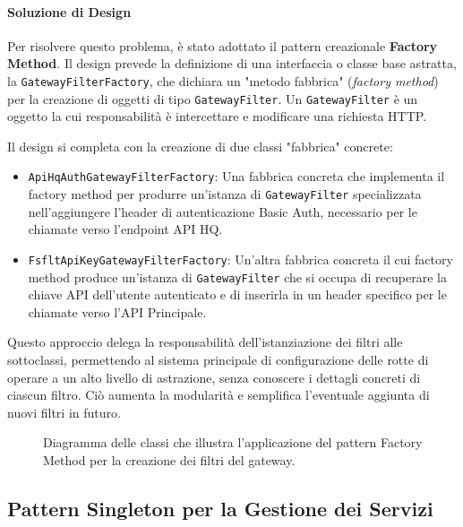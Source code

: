 \documentclass[12pt,a4paper,openright,twoside]{book}
\begin{document}
\paragraph{Soluzione di Design}
Per risolvere questo problema, è stato adottato il pattern creazionale \textbf{Factory Method}. Il design prevede la definizione di una interfaccia o classe base astratta, la \texttt{GatewayFilterFactory}, che dichiara un "metodo fabbrica" (\textit{factory method}) per la creazione di oggetti di tipo \texttt{GatewayFilter}. Un \texttt{GatewayFilter} è un oggetto la cui responsabilità è intercettare e modificare una richiesta HTTP.

Il design si completa con la creazione di due classi "fabbrica" concrete:
\begin{itemize}
    \item \texttt{ApiHqAuthGatewayFilterFactory}: Una fabbrica concreta che implementa il factory method per produrre un'istanza di \texttt{GatewayFilter} specializzata nell'aggiungere l'header di autenticazione Basic Auth, necessario per le chiamate verso l'endpoint API HQ.
    \item \texttt{FsfltApiKeyGatewayFilterFactory}: Un'altra fabbrica concreta il cui factory method produce un'istanza di \texttt{GatewayFilter} che si occupa di recuperare la chiave API dell'utente autenticato e di inserirla in un header specifico per le chiamate verso l'API Principale.
\end{itemize}
Questo approccio delega la responsabilità dell'istanziazione dei filtri alle sottoclassi, permettendo al sistema principale di configurazione delle rotte di operare a un alto livello di astrazione, senza conoscere i dettagli concreti di ciascun filtro. Ciò aumenta la modularità e semplifica l'eventuale aggiunta di nuovi filtri in futuro.

\vspace{1cm}
\begin{figure}[h!]
    \centering
    \caption{Diagramma delle classi che illustra l'applicazione del pattern Factory Method per la creazione dei filtri del gateway.}
    \label{fig:factory_method_uml}
\end{figure}
\vspace{1cm}

\subsection{Pattern Singleton per la Gestione dei Servizi}
\label{subsec:design_singleton}
\end{document}
